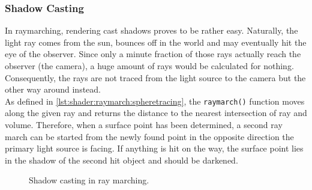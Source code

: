 \clearpage
\subsubsection{Shadow Casting}
In \gls{raymarching}, rendering cast shadows  proves to be rather easy. Naturally, the light ray comes from the sun, bounces off in the world and may eventually hit the eye of the observer.
Since only a minute fraction of those rays actually reach the observer (the camera), a huge amount of rays would be calculated for nothing.
Consequently, the rays are not traced from the light source to the camera but the other way around instead.
\\
As defined in \autoref{lst:shader:raymarch:spheretracing}, the \lstinline[language=HLSL]{raymarch()} function moves along the given ray and returns the distance to the nearest intersection of ray and volume.
Therefore, when a surface point has been determined, a second ray march can be started from the newly found point in the opposite direction the primary light source is facing. If anything is hit on the way, the surface point lies in the shadow of the second hit object and should be darkened.

\begin{figure}[H]
    \centering
    \caption{Shadow casting in ray marching.}
    \label{img:tikz:rendering:shadowcasting}
\end{figure}

